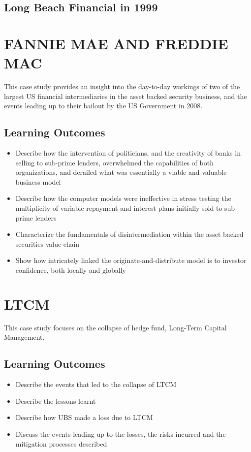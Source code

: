 \documentclass[]{article}
\begin{document}
\subsection{Long Beach Financial in 1999}


\newpage
\section{FANNIE MAE AND FREDDIE MAC}

This case study provides an insight into the day-to-day workings of two of the largest US financial intermediaries in the asset backed security business, and the events leading up to their bailout by the US Government in 2008.

\subsection{Learning Outcomes}

\begin{itemize}
\item Describe how the intervention of politicians, and the creativity of banks in
selling to sub-prime lenders, overwhelmed the capabilities of both
organizations, and derailed what was essentially a viable and valuable
business model
\item Describe how the computer models were ineffective in stress testing the
multiplicity of variable repayment and interest plans initially sold to
sub-prime lenders
\item Characterize the fundamentals of disintermediation within the asset backed
securities value-chain
\item Show how intricately linked the originate-and-distribute model is to investor
confidence, both locally and globally
\end{itemize}
\newpage
\section{LTCM}
This case study focuses on the collapse of hedge fund, Long-Term Capital Management.

\subsection{Learning Outcomes}
\begin{itemize}
\item Describe the events that led to the collapse of LTCM
\item Describe the lessons learnt
\item Describe how UBS made a loss due to LTCM
\item Discuss the events leading up to the losses, the risks incurred and the mitigation processes described
\end{itemize}
\end{document}
